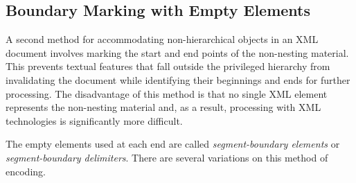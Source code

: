 \subsection[{Boundary Marking with Empty Elements}]{Boundary Marking with Empty Elements}\label{NHBM}\par
A second method for accommodating non-hierarchical objects in an XML document involves marking the start and end points of the non-nesting material. This prevents textual features that fall outside the privileged hierarchy from invalidating the document while identifying their beginnings and ends for further processing. The disadvantage of this method is that no single XML element represents the non-nesting material and, as a result, processing with XML technologies is significantly more difficult.\par
The empty elements used at each end are called \textit{segment-boundary elements} or \textit{segment-boundary delimiters}. There are several variations on this method of encoding.\par
